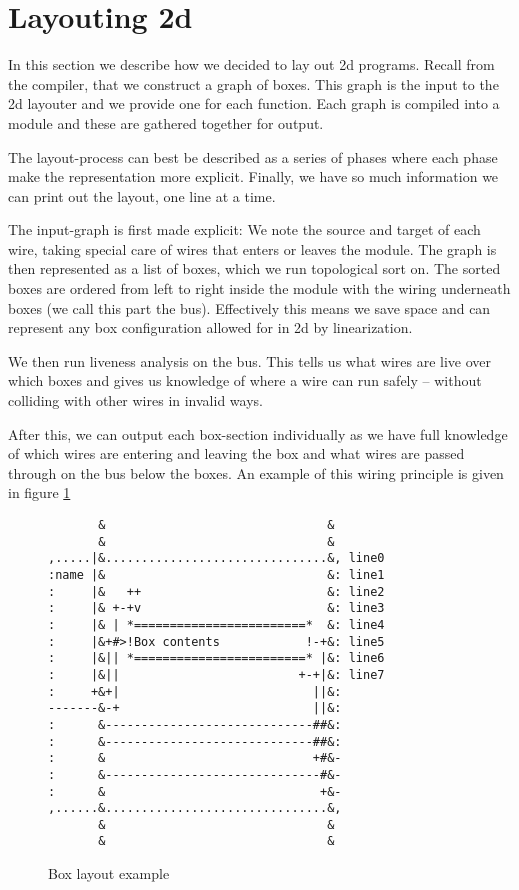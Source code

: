 \section{Layouting 2d}

In this section we describe how we decided to lay out 2d
programs. Recall from the compiler, that we construct a graph of
boxes. This graph is the input to the 2d layouter and we provide one
for each function. Each graph is compiled into a module and these are
gathered together for output.

The layout-process can best be described as a series of phases where
each phase make the representation more explicit. Finally, we have so
much information we can print out the layout, one line at a time.

The input-graph is first made explicit: We note the source and target
of each wire, taking special care of wires that enters or leaves the
module. The graph is then represented as a list of boxes, which we run
topological sort on. The sorted boxes are ordered from left to right
inside the module with the wiring underneath boxes (we call this part
the bus). Effectively this means we save space and can represent any
box configuration allowed for in 2d by linearization.

We then run liveness analysis on the bus. This tells us what wires are
live over which boxes and gives us knowledge of where a wire can run
safely -- without colliding with other wires in invalid ways.

After this, we can output each box-section individually as we have
full knowledge of which wires are entering and leaving the box and
what wires are passed through on the bus below the boxes. An example
of this wiring principle is given in figure \ref{fig:1}
\begin{figure}
  \centering

  \begin{center}
\begin{verbatim}
       &                               &
       &                               &
,.....|&...............................&, line0
:name |&                               &: line1
:     |&   ++                          &: line2
:     |& +-+v                          &: line3
:     |& | *========================*  &: line4
:     |&+#>!Box contents            !-+&: line5
:     |&|| *========================* |&: line6
:     |&||                         +-+|&: line7
:     +&+|                           ||&:
-------&-+                           ||&:
:      &-----------------------------##&:
:      &-----------------------------##&:
:      &                             +#&-
:      &------------------------------#&-
:      &                              +&-
,......&...............................&,
       &                               &
       &                               &
\end{verbatim}
  \end{center}
  \caption{Box layout example}\label{fig:1}
\end{figure}

